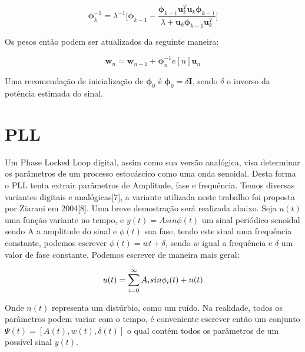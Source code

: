 \documentclass[a4paper, 12pt]{book}
\begin{document}
\Large
\begin{equation}
\boldsymbol{\phi}^{-1}_k=\lambda^{-1}\Bigg[\boldsymbol{\phi}_{k-1}-\frac{\boldsymbol{\phi}_{k-1}\boldsymbol{u}^T_k\boldsymbol{u}_k\boldsymbol{\phi}_{k-1}}{\lambda+\boldsymbol{u}_k\boldsymbol{\phi}_{k-1}\boldsymbol{u}^T_k}\Bigg]
\end{equation}
\normalsize

\indent Os pesos então podem ser atualizados da seguinte maneira:

\begin{equation}
\boldsymbol{w}_{n}=\boldsymbol{w}_{n-1} +  \boldsymbol{\phi}_{n}^{-1}e[n] \boldsymbol{u}_{n}
\end{equation}

\indent Uma recomendação de inicialização de $\boldsymbol{\phi}_0$ é $\boldsymbol{\phi}_0=\delta \boldsymbol{I}$, sendo $\delta$ o inverso da potência estimada do sinal.






\section{PLL}

\indent Um Phase Locked Loop digital, assim como sua versão analógica, visa determinar os parâmetros de um processo estocáscico como uma onda senoidal. Desta forma o PLL tenta extrair parâmetros de Amplitude, fase e frequência. Temos diversas variantes digitais e analógicas[7], a variante utilizada neste trabalho foi proposta por Ziarani em 2004[8]. Uma breve demostração será realizada abaixo.
\indent Seja $u(t)$ uma função variante no tempo, e $y(t)=Asin\phi(t)$ um sinal periódico senoidal sendo A a amplitude do sinal e $\phi(t)$ sua fase, tendo este sinal uma frequência constante, podemos escrever $\phi(t)=wt+\delta$, sendo $w$ igual a frequência e $\delta$ um valor de fase constante. Podemos escrever de maneira mais geral:

\begin{equation}
u(t)=\sum_{i=0}^{\infty}A_i sin\phi_i(t)\space+\space n(t)
\end{equation}

Onde $n(t)$ representa um distúrbio, como um ruído. Na realidade, todos os parâmetros podem variar com o tempo, é conveniente escrever então um conjunto $\Psi(t)=[A(t), w(t), \delta(t)]$ o qual contém todos os parâmetros de um possível sinal $y(t)$.
\end{document}
